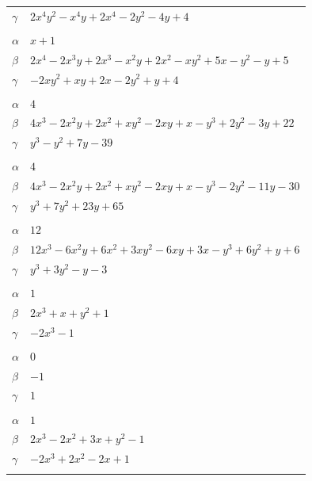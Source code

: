 \documentclass[11pt]{article}
\begin{document}
\begin{longtable}{@{}ll@{}}
$\gamma$ & $2x^{4}y^{2}-x^{4}y+2x^{4}-2y^{2}-4y+4$\\
\addlinespace[3pt]
\multicolumn{2}{@{}l}{$\{i,j\}=\{0,21\}$, $k_{ij}=2\cdot 3$}\\
$\alpha$ & $x+1$\\
$\beta$ & $2x^{4}-2x^{3}y+2x^{3}-x^{2}y+2x^{2}-xy^{2}+5x-y^{2}-y+5$\\
$\gamma$ & $-2xy^{2}+xy+2x-2y^{2}+y+4$\\
\addlinespace[3pt]
\multicolumn{2}{@{}l}{$\{i,j\}=\{1,12\}$, $k_{ij}=2^{2}\cdot 3^{3}$}\\
$\alpha$ & $4$\\
$\beta$ & $4x^{3}-2x^{2}y+2x^{2}+xy^{2}-2xy+x-y^{3}+2y^{2}-3y+22$\\
$\gamma$ & $y^{3}-y^{2}+7y-39$\\
\addlinespace[3pt]
\multicolumn{2}{@{}l}{$\{i,j\}=\{1,13\}$, $k_{ij}=2^{2}\cdot 3^{3}$}\\
$\alpha$ & $4$\\
$\beta$ & $4x^{3}-2x^{2}y+2x^{2}+xy^{2}-2xy+x-y^{3}-2y^{2}-11y-30$\\
$\gamma$ & $y^{3}+7y^{2}+23y+65$\\
\addlinespace[3pt]
\multicolumn{2}{@{}l}{$\{i,j\}=\{1,14\}$, $k_{ij}=2^{2}\cdot 3^{2}$}\\
$\alpha$ & $12$\\
$\beta$ & $12x^{3}-6x^{2}y+6x^{2}+3xy^{2}-6xy+3x-y^{3}+6y^{2}+y+6$\\
$\gamma$ & $y^{3}+3y^{2}-y-3$\\
\addlinespace[3pt]
\multicolumn{2}{@{}l}{$\{i,j\}=\{2,5\}$, $k_{ij}=2$}\\
$\alpha$ & $1$\\
$\beta$ & $2x^{3}+x+y^{2}+1$\\
$\gamma$ & $-2x^{3}-1$\\
\addlinespace[3pt]
\multicolumn{2}{@{}l}{$\{i,j\}=\{2,9\}$, $k_{ij}=2$}\\
$\alpha$ & $0$\\
$\beta$ & $-1$\\
$\gamma$ & $1$\\
\addlinespace[3pt]
\multicolumn{2}{@{}l}{$\{i,j\}=\{2,10\}$, $k_{ij}=3$}\\
$\alpha$ & $1$\\
$\beta$ & $2x^{3}-2x^{2}+3x+y^{2}-1$\\
$\gamma$ & $-2x^{3}+2x^{2}-2x+1$\\
\addlinespace[3pt]
\multicolumn{2}{@{}l}{$\{i,j\}=\{2,12\}$, $k_{ij}=2^{5}$}\\

\end{longtable}
\end{document}
